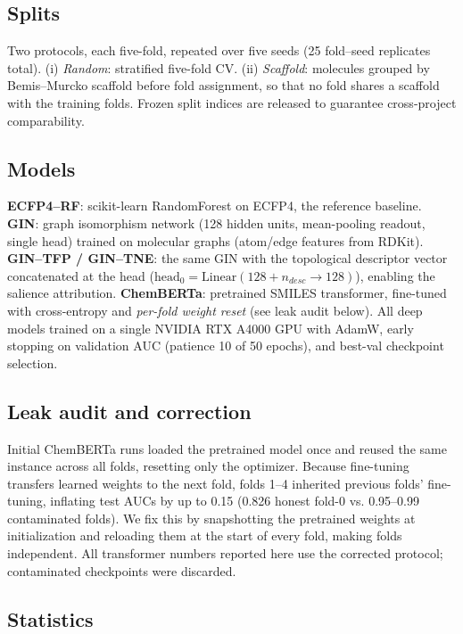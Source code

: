 \documentclass[11pt,a4paper]{article}
\begin{document}
\subsection{Splits}

Two protocols, each five-fold, repeated over five seeds (25 fold--seed replicates total). (i) \emph{Random}: stratified five-fold CV. (ii) \emph{Scaffold}: molecules grouped by Bemis--Murcko scaffold before fold assignment, so that no fold shares a scaffold with the training folds. Frozen split indices are released to guarantee cross-project comparability.

\subsection{Models}

\textbf{ECFP4--RF}: scikit-learn RandomForest on ECFP4, the reference baseline. \textbf{GIN}: graph isomorphism network (128 hidden units, mean-pooling readout, single head) trained on molecular graphs (atom/edge features from RDKit). \textbf{GIN--TFP / GIN--TNE}: the same GIN with the topological descriptor vector concatenated at the head ($\mathrm{head}_0 = \mathrm{Linear}(128 + n_{desc} \to 128)$), enabling the salience attribution. \textbf{ChemBERTa}: pretrained SMILES transformer, fine-tuned with cross-entropy and \emph{per-fold weight reset} (see leak audit below). All deep models trained on a single NVIDIA RTX A4000 GPU with AdamW, early stopping on validation AUC (patience 10 of 50 epochs), and best-val checkpoint selection.

\subsection{Leak audit and correction}

Initial ChemBERTa runs loaded the pretrained model once and reused the same instance across all folds, resetting only the optimizer. Because fine-tuning transfers learned weights to the next fold, folds 1--4 inherited previous folds' fine-tuning, inflating test AUCs by up to 0.15 (0.826 honest fold-0 vs. 0.95--0.99 contaminated folds). We fix this by snapshotting the pretrained weights at initialization and reloading them at the start of every fold, making folds independent. All transformer numbers reported here use the corrected protocol; contaminated checkpoints were discarded.

\subsection{Statistics}
\end{document}
